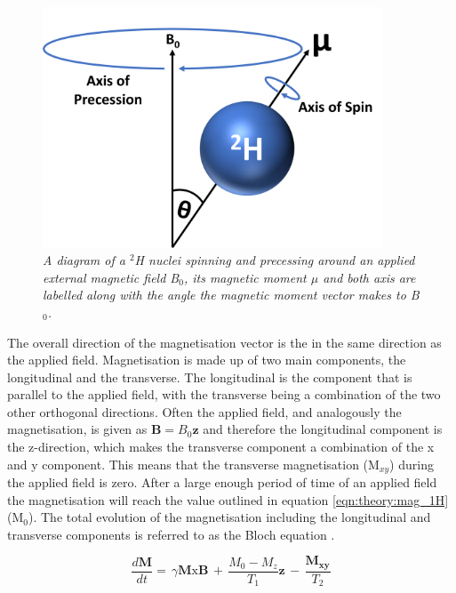 \documentclass[class=article, crop=false]{standalone}
\begin{document}
\begin{figure}
    \centering
    \includegraphics[width=0.9\textwidth]{Figures/Theory/Moment.png}
    \caption{\textit{A diagram of a $^2$H nuclei spinning and precessing around an applied external magnetic field B$_0$, its magnetic moment $\mu$ and both axis are labelled along with the angle the magnetic moment vector makes to B$_0$.}}
    \label{fig:theory:moment}
\end{figure}

The overall direction of the magnetisation vector is the in the same direction as the applied field. Magnetisation is made up of two main components, the longitudinal and the transverse. The longitudinal is the component that is parallel to the applied field, with the transverse being a combination of the two other orthogonal directions. Often the applied field, and analogously the magnetisation, is given as $\mathbf{B}=B_0\mathbf{z}$ and therefore the longitudinal component is the z-direction, which makes the transverse component a combination of the x and y component. This means that the transverse magnetisation (M$_{xy}$) during the applied field is zero. After a large enough period of time of an applied field the magnetisation  will reach the value outlined in equation \ref{eqn:theory:mag_1H} (M$_0$). The total evolution of the magnetisation including the longitudinal and transverse components is referred to as the Bloch equation \cite{Bloch1946NuclearInduction}.

\begin{equation}
    \frac{d\mathbf{M}}{dt} = \, \gamma\mathbf{M}\textrm{x}\mathbf{B} \, + \, \frac{M_0-M_z}{T_1}\mathbf{z} \, - \, \frac{\mathbf{M_{xy}}}{T_2}
    \label{eqn:theory:Bloch}
\end{equation}
\end{document}
